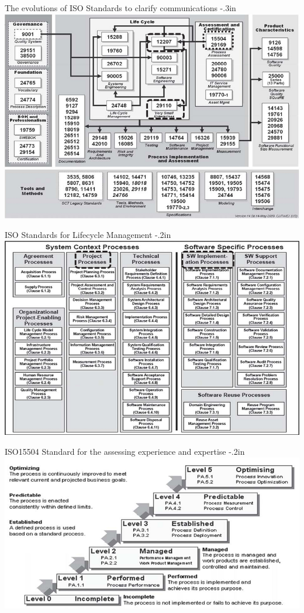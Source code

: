 \begin{frame}{The evolutions of ISO Standards to clarify communications}
\kern -.3in
\includegraphics[width=.9\textwidth]{isohistory.png}
\end{frame}

\begin{frame}{ISO Standards for Lifecycle Management}
\kern -.2in
\includegraphics[width=.85\textwidth]{isolifecycle.png}
\end{frame}

\begin{frame}{ISO15504 Standard for the assessing experience and expertise}
\kern -.2in
\includegraphics[width=.85\textwidth]{15504.png}
\end{frame}


